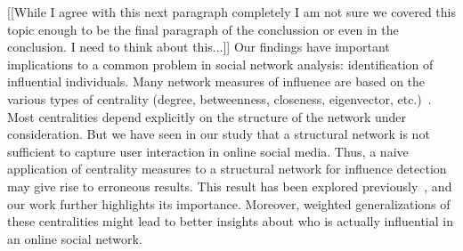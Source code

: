 

[[While I agree with this next paragraph completely I am not sure we covered this topic enough to be the final paragraph of the conclussion or even in the conclusion. I need to think about this...]]
Our findings have important implications to a common problem in social network analysis: identification of influential individuals. Many network measures of influence are based on the various types of centrality (degree, betweenness, closeness, eigenvector, etc.)~\cite{newman2009networks}. Most centralities depend explicitly on the structure of the network under consideration. But we have seen in our study that a structural network is not sufficient to capture user interaction in online social media. Thus, a naive application of centrality measures to a structural network for influence detection may give rise to erroneous results. This result has been explored previously~\cite{kitsak2010identification}, and our work further highlights its importance. Moreover, weighted generalizations of these centralities might lead to better insights about who is actually influential in an online social network.

